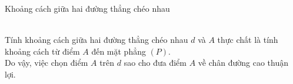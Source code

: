 \begin{dang}{Khoảng cách giữa hai đường thẳng chéo nhau}
\begin{enumerate}
{	
		}
		{\nx 
			\ \\
			Tính khoảng cách giữa hai đường thẳng chéo nhau $d$ và $A$ thực chất là tính khoảng cách từ điểm $A$ đến mặt phẳng $(P)$.\\
			Do vậy, việc chọn điểm $A$ trên $d$ sao cho đưa điểm $A$ về chân đường cao thuận lợi.}\\

\end{enumerate}
\end{dang}
